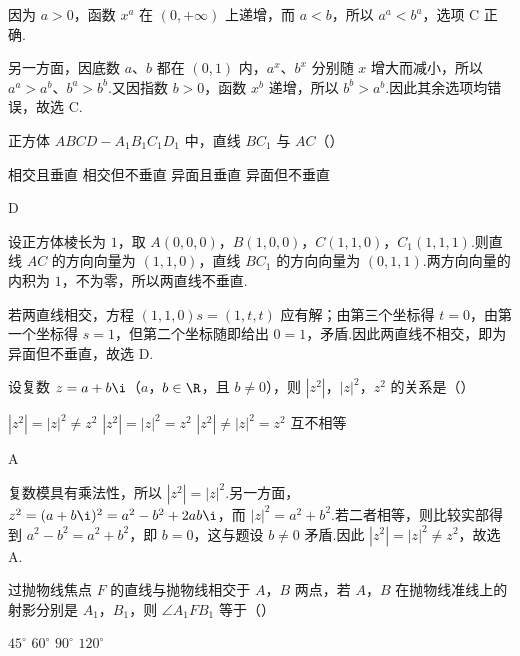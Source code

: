 \documentclass[UTF8,a4paper,oneside,11pt]{ctexbook}
\begin{document}
\begin{solution}
因为 \(a>0\)，函数 \(x^a\) 在 \((0,+\infty)\) 上递增，而 \(a<b\)，所以
\(a^a<b^a\)，选项 C 正确.

另一方面，因底数 \(a\)、\(b\) 都在 \((0,1)\) 内，\(a^x\)、\(b^x\) 分别随 \(x\) 增大而减小，所以
\(a^a>a^b\)、\(b^a>b^b\).又因指数 \(b>0\)，函数 \(x^b\) 递增，所以 \(b^b>a^b\).因此其余选项均错误，故选 C.
\end{solution}

\begin{problem}

正方体 \(ABCD-A_1B_1C_1D_1\) 中，直线 \(BC_1\) 与 \(AC\)（\quad）

\choices
    {相交且垂直}
    {相交但不垂直}
    {异面且垂直}
    {异面但不垂直}
\end{problem}

\begin{answer}
D
\end{answer}

\begin{solution}
设正方体棱长为 \(1\)，取
\(A(0,0,0)\)，\(B(1,0,0)\)，\(C(1,1,0)\)，\(C_1(1,1,1)\).则直线 \(AC\) 的方向向量为 \((1,1,0)\)，直线 \(BC_1\) 的方向向量为 \((0,1,1)\).两方向向量的内积为 \(1\)，不为零，所以两直线不垂直.

若两直线相交，方程 \((1,1,0)s=(1,t,t)\) 应有解；由第三个坐标得 \(t=0\)，由第一个坐标得 \(s=1\)，但第二个坐标随即给出 \(0=1\)，矛盾.因此两直线不相交，即为异面但不垂直，故选 D.
\end{solution}

\begin{problem}

设复数 \(z=a+b\i\)（\(a\)，\(b\in\R\)，且 \(b\ne 0\)），则 \(|z^2|\)，\(|z|^2\)，\(z^2\) 的关系是（\quad）

\choices
    {\(|z^2|=|z|^2\ne z^2\)}
    {\(|z^2|=|z|^2=z^2\)}
    {\(|z^2|\ne |z|^2=z^2\)}
    {互不相等}
\end{problem}

\begin{answer}
A
\end{answer}

\begin{solution}
复数模具有乘法性，所以
\(|z^2|=|z|^2\).另一方面，
\(z^2=(a+b\i)^2=a^2-b^2+2ab\i\)，而
\(|z|^2=a^2+b^2\).若二者相等，则比较实部得到 \(a^2-b^2=a^2+b^2\)，即 \(b=0\)，这与题设 \(b\ne0\) 矛盾.因此 \(|z^2|=|z|^2\ne z^2\)，故选 A.
\end{solution}

\begin{problem}

过抛物线焦点 \(F\) 的直线与抛物线相交于 \(A\)，\(B\) 两点，若 \(A\)，\(B\) 在抛物线准线上的射影分别是 \(A_1\)，\(B_1\)，则 \(\angle A_1FB_1\) 等于（\quad）

\choices
    {\(45^\circ\)}
    {\(60^\circ\)}
    {\(90^\circ\)}
    {\(120^\circ\)}
\end{problem}
\end{document}
